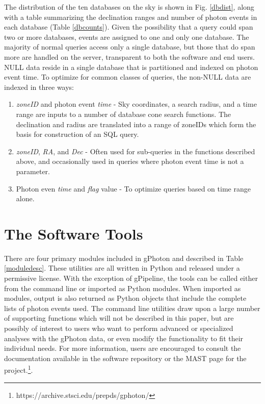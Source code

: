 \documentclass[preprint]{aastex}
\begin{document}
The distribution of the ten databases on the sky is shown in Fig. \ref{dbdist}, along with a table summarizing the declination ranges and number of photon events in each database (Table \ref{dbcounts}). Given the possibility that a query could span two or more databases, events are assigned to one and only one database. The majority of normal queries access only a single database, but those that do span more are handled on the server, transparent to both the software and end users.
	NULL data reside in a single database that is partitioned and indexed on photon event time. To optimize for common classes of queries, the non-NULL data are indexed in three ways:
\begin{enumerate}
	\item{\emph{zoneID} and photon event \emph{time} - Sky coordinates, a search radius, and a time range are inputs to a number of database cone search functions. The declination and radius are translated into a range of zoneIDs which form the basis for construction of an SQL query.}
	\item{\emph{zoneID}, \emph{RA}, and \emph{Dec} - Often used for sub-queries in the functions described above, and occasionally used in queries where photon event time is not a parameter.}
	\item{Photon even \emph{time} and \emph{flag} value - To optimize queries based on time range alone.}
\end{enumerate}

\section{The Software Tools}
\label{softwaretools}
There are four primary modules included in gPhoton and described in Table \ref{moduledesc}. These utilities are all written in Python and released under a permissive license. With the exception of gPipeline, the tools can be called either from the command line or imported as Python modules. When imported as modules, output is also returned as Python objects that include the complete lists of photon events used. The command line utilities draw upon a large number of supporting functions which will not be described in this paper, but are possibly of interest to users who want to perform advanced or specialized analyses with the gPhoton data, or even modify the functionality to fit their individual needs. For more information, users are encouraged to consult the documentation available in the software repository or the MAST page for the project.\footnote{https://archive.stsci.edu/prepds/gphoton/}.
\end{document}

